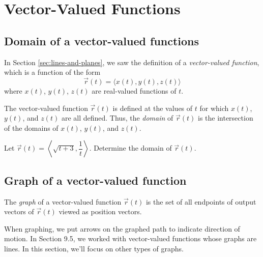 \newlecture

\setcounter{section}{5}
\def\coursetopicnumber{I}
\def\topic{Vector-Valued Functions} %
\def\shorttopic{Vector-valued functions} %
\def\textbookname{Active Calculus} %
\def\shorttextbookname{AC} %
\def\textbooksection{9.6} %
\def\textbooksectionurl{https://activecalculus.org/vector/S-9-6-Vector-Valued-Functions.html} %
\def\handoutday{} %



\thispagestyle{plain}
\topstuff

\section{\topic{} \booklink{}}
\label{sec:vector-valued-functions}
\subsection{Domain of a vector-valued functions}
In Section \ref{sec:lines-and-planes}, we saw the definition of a \emph{vector-valued function}, which is a function of the form 
\[
    \vec{r}(t)=\langle x(t),y(t),z(t)\rangle
\] 
where $x(t)$, $y(t)$, $z(t)$ are real-valued functions of $t$.

\begin{defn}
    The vector-valued function $\vec{r}(t)$ is defined at the values of $t$ for which $x(t)$, $y(t)$, and $z(t)$ are all defined. Thus, the \emph{domain} of $\vec{r}(t)$ is the intersection of the domains of $x(t)$, $y(t)$, and $z(t)$.
\end{defn}

\begin{ex}
    Let $\vec{r}(t)=\left\langle \sqrt{t+3},\dfrac{1}{t}\right\rangle$. Determine the domain of $\vec{r}(t)$.
\end{ex}

\vfill

\subsection{Graph of a vector-valued function}
\begin{defn}
    The \emph{graph} of a vector-valued function $\vec{r}(t)$ is the set of all endpoints of output vectors of $\vec{r}(t)$ viewed as position vectors.
\end{defn}
When graphing, we put arrows on the graphed path to indicate direction of motion. In Section 9.5, we worked with vector-valued functions whose graphs are lines. In this section, we'll focus on other types of graphs.

